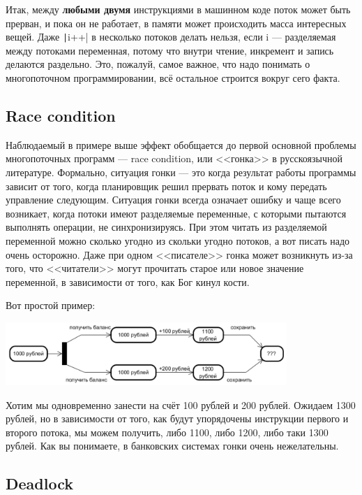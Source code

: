 \documentclass[a5paper]{article}
\begin{document}
Итак, между \textbf{любыми двумя} инструкциями в машинном коде поток может быть прерван, и пока он не работает, в памяти может происходить масса интересных вещей. Даже \texttt|i++| в несколько потоков делать нельзя, если i --- разделяемая между потоками переменная, потому что внутри чтение, инкремент и запись делаются раздельно. Это, пожалуй, самое важное, что надо понимать о многопоточном программировании, всё остальное строится вокруг сего факта.

\subsection{Race condition}

Наблюдаемый в примере выше эффект обобщается до первой основной проблемы многопоточных программ --- race condition, или <<гонка>> в русскоязычной литературе. Формально, ситуация гонки --- это когда результат работы программы зависит от того, когда планировщик решил прервать поток и кому передать управление следующим. Ситуация гонки всегда означает ошибку и чаще всего возникает, когда потоки имеют разделяемые переменные, с которыми пытаются выполнять операции, не синхронизируясь. При этом читать из разделяемой переменной можно сколько угодно из скольки угодно потоков, а вот писать надо очень осторожно. Даже при одном <<писателе>> гонка может возникнуть из-за того, что <<читатели>> могут прочитать старое или новое значение переменной, в зависимости от того, как Бог кинул кости.

Вот простой пример:

\begin{center}
    \includegraphics[width=0.8\textwidth]{raceCondition.png}
\end{center}

Хотим мы одновременно занести на счёт 100 рублей и 200 рублей. Ожидаем 1300 рублей, но в зависимости от того, как будут упорядочены инструкции первого и второго потока, мы можем получить, либо 1100, либо 1200, либо таки 1300 рублей. Как вы понимаете, в банковских системах гонки очень нежелательны.

\subsection{Deadlock}
\end{document}
